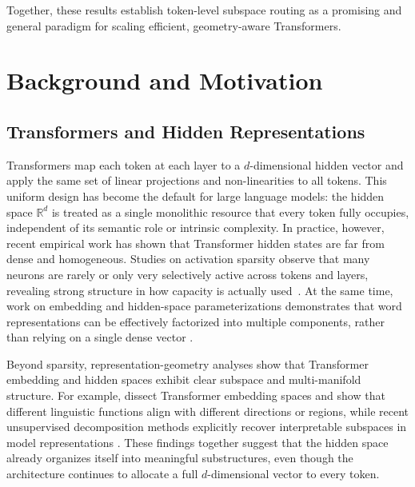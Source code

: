 \documentclass{article}
\theoremstyle{plain}
\theoremstyle{definition}
\theoremstyle{remark}
\begin{document}
Together, these results establish token-level subspace routing as a promising
and general paradigm for scaling efficient, geometry-aware Transformers.


\section{Background and Motivation}

\subsection{Transformers and Hidden Representations}

Transformers map each token at each layer to a $d$-dimensional hidden
vector and apply the same set of linear projections and non-linearities to
all tokens.
This uniform design has become the default for large language models: the
hidden space $\mathbb{R}^d$ is treated as a single monolithic resource that
every token fully occupies, independent of its semantic role or intrinsic
complexity.
In practice, however, recent empirical work has shown that Transformer
hidden states are far from dense and homogeneous.
Studies on activation sparsity observe that many neurons are rarely or only
very selectively active across tokens and layers, revealing strong structure
in how capacity is actually used~\citep{li2023lazyneuron,liu2024trainingfreeactivationsparsitylarge,zhang2024activationsparsitypretrain,farina2024sparsitysurvey}.
At the same time, work on embedding and hidden-space parameterizations
demonstrates that word representations can be effectively factorized into
multiple components, rather than relying on a single dense vector
\citep{baevski2019adaptiveinput,mehta2020define}.

Beyond sparsity, representation-geometry analyses show that Transformer
embedding and hidden spaces exhibit clear subspace and multi-manifold
structure.
For example, \citet{mickus2022muppet} dissect Transformer embedding spaces
and show that different linguistic functions align with different directions
or regions, while recent unsupervised decomposition methods explicitly
recover interpretable subspaces in model representations
\citep{huang2025ndm,csreft2025representation}.
These findings together suggest that the hidden space already organizes
itself into meaningful substructures, even though the architecture continues
to allocate a full $d$-dimensional vector to every token.
\end{document}
